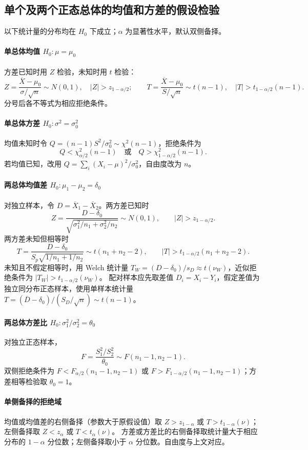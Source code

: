\documentclass[../main.tex]{subfiles}
\begin{document}
\subsection{单个及两个正态总体的均值和方差的假设检验}
以下统计量的分布均在 $H_0$ 下成立；$\alpha$ 为显著性水平，默认双侧备择。
\paragraph{单总体均值 $H_0:\mu=\mu_0$}
方差已知时用 $Z$ 检验，未知时用 $t$ 检验：
\[
Z=\frac{\overline X-\mu_0}{\sigma/\sqrt n}\sim N(0,1),\quad |Z|>z_{1-\alpha/2};
\qquad T=\frac{\overline X-\mu_0}{S/\sqrt n}\sim t(n-1),\quad |T|>t_{1-\alpha/2}(n-1).
\]
分号后各不等式为相应拒绝条件。
\paragraph{单总体方差 $H_0:\sigma^2=\sigma_0^2$}
均值未知时令 $Q=(n-1)S^2/\sigma_0^2\sim\chi^2(n-1)$，拒绝条件为
\[
Q<\chi^2_{\alpha/2}(n-1)\quad\text{或}\quad Q>\chi^2_{1-\alpha/2}(n-1).
\]
若均值已知，改用 $Q=\sum_i(X_i-\mu)^2/\sigma_0^2$，自由度改为 $n$。
\paragraph{两总体均值差 $H_0:\mu_1-\mu_2=\delta_0$}
对独立样本，令 $D=\overline X_1-\overline X_2$。两方差已知时
\[
Z=\frac{D-\delta_0}{\sqrt{\sigma_1^2/n_1+\sigma_2^2/n_2}}\sim N(0,1),\qquad
|Z|>z_{1-\alpha/2}.
\]
两方差未知但相等时
\[
T=\frac{D-\delta_0}{S_p\sqrt{1/n_1+1/n_2}}\sim t(n_1+n_2-2),\qquad
|T|>t_{1-\alpha/2}(n_1+n_2-2).
\]
未知且不假定相等时，用 Welch 统计量 $T_W=(D-\delta_0)/s_D\approx t(\nu_W)$，近似拒绝条件为 $|T_W|>t_{1-\alpha/2}(\nu_W)$。
配对样本应先取差值 $D_i=X_i-Y_i$，假定差值为独立同分布正态样本，使用单样本统计量 $T=(\overline D-\delta_0)/(S_D/\sqrt n)\sim t(n-1)$。
\paragraph{两总体方差比 $H_0:\sigma_1^2/\sigma_2^2=\theta_0$}
对独立正态样本，
\[
F=\frac{S_1^2/S_2^2}{\theta_0}\sim F(n_1-1,n_2-1).
\]
双侧拒绝条件为 $F<F_{\alpha/2}(n_1-1,n_2-1)$ 或 $F>F_{1-\alpha/2}(n_1-1,n_2-1)$；方差相等检验取 $\theta_0=1$。
\paragraph{单侧备择的拒绝域}
均值或均值差的右侧备择（参数大于原假设值）取 $Z>z_{1-\alpha}$ 或 $T>t_{1-\alpha}(\nu)$；左侧备择取 $Z<z_\alpha$ 或 $T<t_\alpha(\nu)$。
方差或方差比的右侧备择取统计量大于相应分布的 $1-\alpha$ 分位数；左侧备择取小于 $\alpha$ 分位数。自由度与上文对应。
\end{document}
